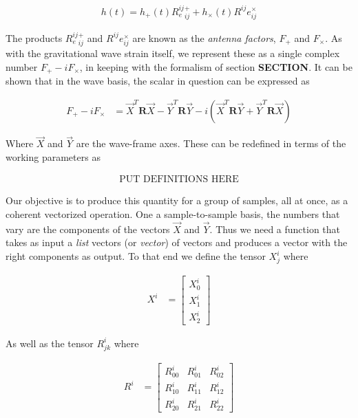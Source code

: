 \documentclass[paper=a4, fontsize=11pt]{scrartcl} %
\numberwithin{equation}{section} %
\numberwithin{figure}{section} %
\numberwithin{table}{section} %
\begin{document}
\begin{align}
h(t) = h_{+}(t)R^{ij}_e^+_{ij} + h_{\times}(t)R^{ij}e^{\times}_{ij}
\end{align}

The products $R^{ij}_e^+_{ij}$ and $R^{ij}e^{\times}_{ij}$ are known as the \textit{antenna factors}, $F_{+}$ and $F_{\times}$. As with the gravitational wave strain itself, we represent these as a single complex number $F_{+} - i F_{\times}$, in keeping with the formalism of section \textbf{SECTION}. It can be shown that in the wave basis, the scalar in question can be expressed as  

\begin{align}
F_+ - i F_{\times} &= \vec{X}^T\mathbf{R}\vec{X} - \vec{Y}^T\mathbf{R}\vec{Y} - i(\vec{X}^T\mathbf{R}\vec{Y} + \vec{Y}^T\mathbf{R}\vec{X})
\end{align} 

Where $\vec{X}$ and $\vec{Y}$ are the wave-frame axes. These can be redefined in terms of the working parameters as 

\begin{align}
\text{PUT DEFINITIONS HERE}
\end{align}
 
Our objective is to produce this quantity for a group of samples, all at once, as a coherent vectorized operation. One a sample-to-sample basis, the numbers that vary are the components of the vectors $\vec{X}$ and $\vec{Y}$. Thus we need a function that takes as input a \textit{list} vectors (or \textit{vector}) of vectors and produces a vector with the right components as output. To that end we define the tensor $X^{i}_{j}$ where

\begin{align}
X^i &= 
\begin{bmatrix}
X^{i}_0 \\
X^{i}_1 \\
X^{i}_2
\end{bmatrix}
\end{align}

As well as the tensor $R^{i}_{jk}$ where

\begin{align}
R^{i} &= 
\begin{bmatrix}
R^{i}_{00} & R^{i}_{01} & R^{i}_{02} \\ 
R^{i}_{10} & R^{i}_{11} & R^{i}_{12} \\ 
R^{i}_{20} & R^{i}_{21} & R^{i}_{22}  
\end{bmatrix}
\end{align}
\end{document}
